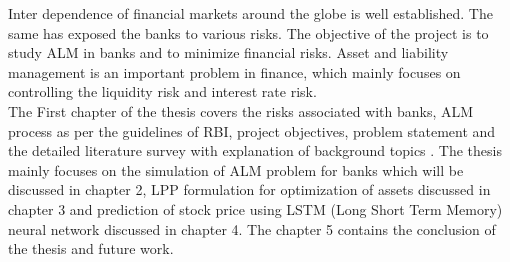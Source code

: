 Inter dependence of financial markets around the globe is well established. The same has exposed the banks to various risks. The objective of the project is to study ALM in banks and to minimize financial risks. Asset and liability management is an important problem in finance, which mainly focuses on controlling the liquidity risk and interest rate risk.\\

The First chapter of the thesis covers the risks associated with banks, ALM process as per the guidelines of RBI, project objectives, problem statement and the detailed literature survey with explanation of background topics . The thesis mainly focuses on the simulation of ALM problem for banks which will be discussed in chapter 2, LPP formulation for optimization of assets discussed in chapter 3 and prediction of stock price using LSTM (Long Short Term Memory) neural network discussed in chapter 4. The chapter 5 contains the conclusion of the thesis and future work.

